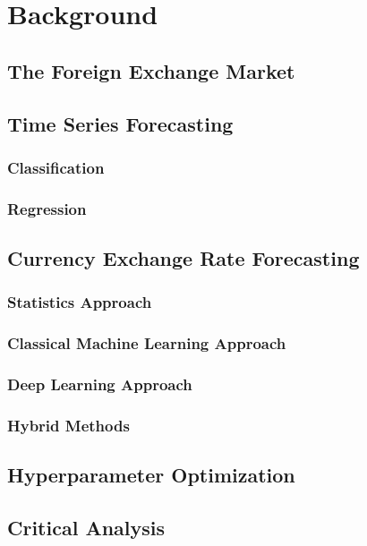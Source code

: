 \chapter{Background}

\section{The Foreign Exchange Market}

\section{Time Series Forecasting}
\subsection{Classification}

\subsection{Regression}

\section{Currency Exchange Rate Forecasting}
\subsection{Statistics Approach}

\subsection{Classical Machine Learning Approach}

\subsection{Deep Learning Approach}

\subsection{Hybrid Methods}

\section{Hyperparameter Optimization}

\section{Critical Analysis}
